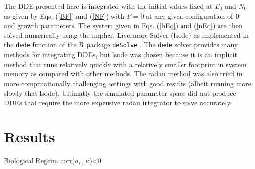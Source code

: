 %
The DDE presented here is integrated with the initial values fixed at $B_0$
and $N_0$ as given by Eqs. (\ref{BF}) and (\ref{NF}) with $F=0$ at any given
configuration of $\bm{\theta}$ and growth parameters. %
The system given in Eqs. (\ref{bEq}) and (\ref{nEq}) are then solved
numerically using the implicit Livermore Solver (lsode) as implemented in the
\verb|dede| function of the R package \verb|deSolve| \cite{soetaert_solving_2010}.
The \verb|dede| solver provides many methods for integrating DDEs, but lsode
was chosen because it is an implicit method that runs relatively quickly with
a relatively smaller footprint in system memory as compared with other methods.
The radau method was also tried in more computationally challenging settings
with good results (albeit running more slowly that lsode). Ultimatly the
simulated parameter space did not produce DDEs that require the more expensive
radau integrator to solve accurately.

%



%
%

%
\clearpage
\section{Results}

{\color{red} Biological Regeim corr($a_s$, $\kappa$)<0}

